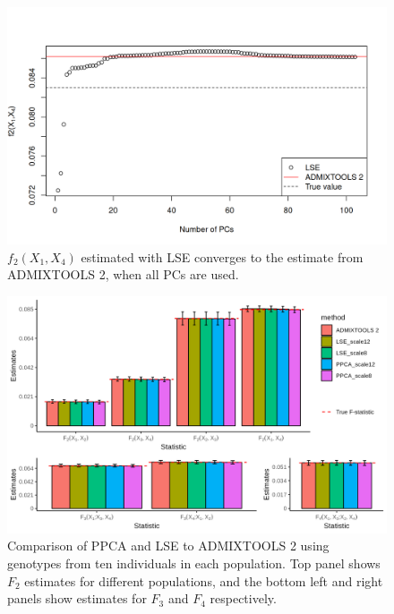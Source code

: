 \documentclass[12pt, letterpaper]{article}
\begin{document}
\begin{figure}[ht!]
    \includegraphics[width=16.5cm]{Images/Supplement/lse_admix.png}
    \centering
    \caption{$f_2(X_1,X_4)$ estimated with LSE converges to the estimate from ADMIXTOOLS 2, when all PCs are used.}
    \label{figS1:pc_scale}
\end{figure}


\begin{figure}[ht!]
    \includegraphics[width=16.5cm]{Images/Supplement/mu0.05_plot_all.png}
    \centering
    \caption{Comparison of PPCA and LSE to ADMIXTOOLS 2 using genotypes from ten individuals in each population. Top panel shows $F_2$ estimates for different populations, and the bottom left and right panels show estimates for $F_3$ and $F_4$ respectively.}
    \label{figS2:pc_scale}
\end{figure}
\end{document}

